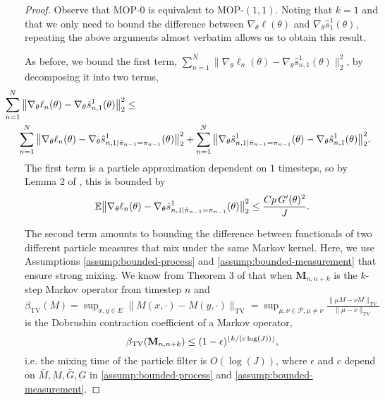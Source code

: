 \begin{proof}
    Observe that MOP-$0$ is equivalent to MOP-$(1,1)$. Noting that $k=1$ and that we only need to bound the difference between $\nabla_\theta \ell(\theta)$ and $\nabla_\theta \hat s_1^1(\theta)$, repeating the above arguments almost verbatim allows us to obtain this result. 

    
As before, we bound the first term, $\sum_{n=1}^N\|\nabla_\theta\ell_n(\theta) - \nabla_\theta\hat s_{n,1}^1(\theta)\|_2^2$, by decomposing it into two terms, 
\begin{eqnarray} \nonumber
\hspace{-10mm} \sum_{n=1}^N\big\|\nabla_\theta\ell_n(\theta) - \nabla_\theta\hat s_{n,1}^1(\theta)\big\|_2^2 &\leq 
\\ &&\hspace{-45mm} 
\sum_{n=1}^N \big\|\nabla_\theta\ell_n(\theta) - \nabla_\theta\hat s_{n,1|\hat\pi_{n-1}=\pi_{n-1}}^1(\theta)\big\|_2^2 + \sum_{n=1}^N \big\|\nabla_\theta\hat s_{n,1|\hat\pi_{n-1}=\pi_{n-1}}^1(\theta) - \nabla_\theta\hat s_{n,1}^1(\theta)\big\|_2^2.
\end{eqnarray}
The first term is a particle approximation dependent on $1$ timesteps, so by Lemma 2 of \cite{karjalainen23}, this is bounded by
\begin{equation}\mathbb{E}\big\|\nabla_\theta\ell_n(\theta) - \nabla_\theta\hat s_{n,1|\hat\pi_{n-1}=\pi_{n-1}}^1(\theta)\big\|_2^2 \leq \frac{Cp \, G'(\theta)^2}{J}.\end{equation}

The second term amounts to bounding the difference between functionals of two different particle measures that mix under the same Markov kernel. Here, we use Assumptions \ref{assump:bounded-process} and \ref{assump:bounded-measurement} that ensure strong mixing. We know from Theorem 3 of \cite{karjalainen23} that when $\textbf{M}_{n,n+k}$ is the $k$-step Markov operator from timestep $n$ and $\beta_{\text{TV}}(M) = \sup _{x, y \in E}\|M(x, \cdot)-M(y, \cdot)\|_{\mathrm{TV}}=\sup _{\mu, \nu \in \mathcal{P}, \mu \neq \nu} \frac{\|\mu M-\nu M\|_{\mathrm{TV}}}{\|\mu-\nu\|_{\mathrm{TV}}}$ is the Dobrushin contraction coefficient of a Markov operator, 
\begin{equation}
\beta_{\text{TV}}(\textbf{M}_{n,n+k}) \leq (1-\epsilon)^{\lfloor k/(c\log(J)) \rfloor},
\end{equation}
i.e. the mixing time of the particle filter is $O(\log(J))$, where $\epsilon$ and $c$ depend on $\bar{M}, \underbar{M}, \bar{G}, \underbar{G}$ in \ref{assump:bounded-process} and \ref{assump:bounded-measurement}. 


\end{proof}
